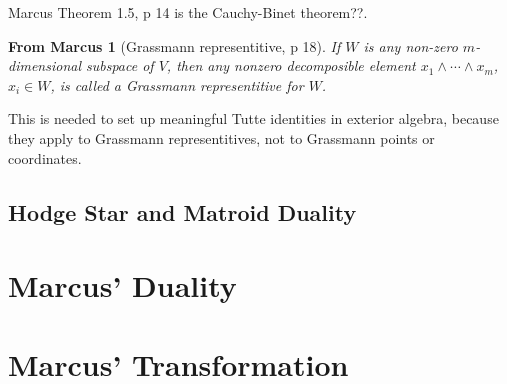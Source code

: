 \documentclass{amsart}
\newtheorem{MRes}{From Marcus}
\begin{document}
Marcus Theorem 1.5, p 14 is the Cauchy-Binet theorem??.

\begin{MRes}[Grassmann representitive, p 18]
  If $W$ is any non-zero $m$-dimensional subspace of $V$, then any
  nonzero decomposible element $x_1 \wedge \cdots \wedge x_m$, $x_i\in W$, is
  called a Grassmann representitive for $W$.
\end{MRes}

This is needed to set up meaningful Tutte identities in exterior algebra,
because they
apply to Grassmann representitives, not to Grassmann points or \Plucker
coordinates.


\subsection{Hodge Star and Matroid Duality}

\section{Marcus' Duality}


\section{Marcus' Transformation}



\end{document}
